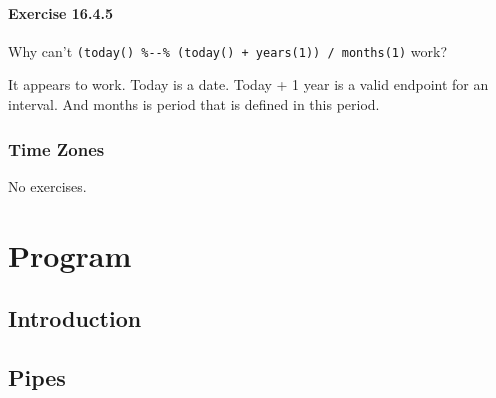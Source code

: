 \documentclass[]{book}
\newenvironment{Shaded}{\begin{snugshade}}{\end{snugshade}}
\newcommand{\CommentTok}[1]{\textcolor[rgb]{0.56,0.35,0.01}{\textit{#1}}}
\newcommand{\DecValTok}[1]{\textcolor[rgb]{0.00,0.00,0.81}{#1}}
\newcommand{\KeywordTok}[1]{\textcolor[rgb]{0.13,0.29,0.53}{\textbf{#1}}}
\newcommand{\NormalTok}[1]{#1}
\newcommand{\OperatorTok}[1]{\textcolor[rgb]{0.81,0.36,0.00}{\textbf{#1}}}
\newcommand{\StringTok}[1]{\textcolor[rgb]{0.31,0.60,0.02}{#1}}
\theoremstyle{plain}
\theoremstyle{remark}
\begin{document}
\hypertarget{exercise-16.4.5}{%
\subsection*{\texorpdfstring{Exercise
{16.4.5}}{Exercise 16.4.5}}\label{exercise-16.4.5}}

Why can't
\texttt{(today()\ \%-\/-\%\ (today()\ +\ years(1))\ /\ months(1)} work?

It appears to work. Today is a date. Today + 1 year is a valid endpoint
for an interval. And months is period that is defined in this period.

\begin{Shaded}
\end{Shaded}

\hypertarget{time-zones}{%
\section{Time Zones}\label{time-zones}}

No exercises.

\hypertarget{part-program}{%
\part{Program}\label{part-program}}

\hypertarget{program-intro}{%
\chapter{Introduction}\label{program-intro}}

\hypertarget{pipes}{%
\chapter{Pipes}\label{pipes}}
\end{document}
